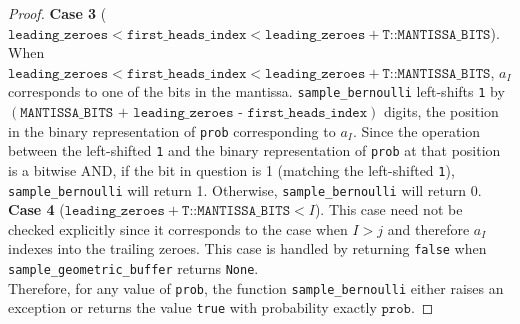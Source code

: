 \documentclass[11pt,a4paper]{article}
\theoremstyle{definition}
\begin{document}
\begin{proof}
\noindent\textbf{Case 3} ($ \texttt{leading\_zeroes} < \texttt{first\_heads\_index}  <  \texttt{leading\_zeroes}  + \texttt{T::MANTISSA\_BITS}$). \\
\noindent When $ \texttt{leading\_zeroes} < \texttt{first\_heads\_index}  <  \texttt{leading\_zeroes}  + \texttt{T::MANTISSA\_BITS}$, $a_I$ corresponds to one of the bits in the mantissa. 
\texttt{sample\_bernoulli}  left-shifts \texttt{1} by  $(\texttt{MANTISSA\_BITS + leading\_zeroes - first\_heads\_index})$ digits, the position in the binary representation of \texttt{prob} corresponding to $a_I$. Since the operation between the left-shifted \texttt{1} and the binary representation of \texttt{prob} at that position is a bitwise AND, if the bit in question is 1 (matching the left-shifted \texttt{1}), \texttt{sample\_bernoulli} will return 1. Otherwise, \texttt{sample\_bernoulli} will return 0. \\

\noindent\textbf{Case 4} ($\texttt{leading\_zeroes}  + \texttt{T::MANTISSA\_BITS} < I$). This case need not be checked explicitly since it corresponds to the case when $I > j$ and therefore $a_I$ indexes into the trailing zeroes. This case is handled by returning \texttt{false} when \texttt{sample\_geometric\_buffer} returns \texttt{None}. \\

\noindent Therefore, for any value of \texttt{prob}, the function \texttt{sample\_bernoulli} either raises an exception or returns the value \texttt{true} with probability exactly $\texttt{prob}$.  
\end{proof}
\end{document}
